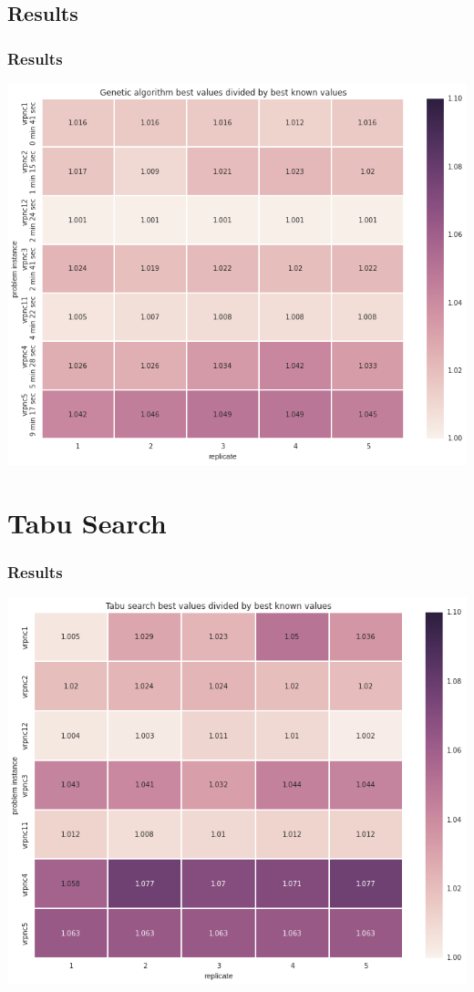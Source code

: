 \documentclass{beamer}
\begin{document}
\subsection{Results}
\begin{frame}
\frametitle{Results}
\begin{center}
\includegraphics[scale=0.25]{figs/ga_best}

\end{center}
\end{frame}

\section{Tabu Search}

\begin{frame}
\frametitle{Results}
\begin{center}
\includegraphics[scale=0.25]{figs/tabu_search}

\end{center}
\end{frame}
\end{document}

